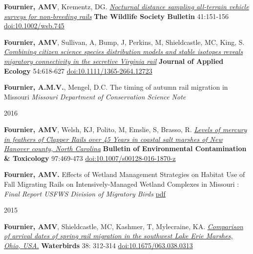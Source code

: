 \documentclass[]{article}
\begin{document}
\textbf{Fournier, AMV}, Krementz, DG.
\href{https://github.com/aurielfournier/aurielfournier.github.io/blob/master/_pdfs/Fournier_et_al-2017-Wildlife_Society_Bulletin.pdf}{\emph{Nocturnal
distance sampling all-terrain vehicle surveys for non-breeding rails}}
\textbf{The Wildlife Society Bulletin} 41:151-156
\url{doi:10.1002/wsb.745}

\textbf{Fournier, AMV}, Sullivan, A, Bump, J, Perkins, M, Shieldcastle,
MC, King, S.
\href{https://github.com/aurielfournier/aurielfournier.github.io/blob/master/_pdfs/Fournier\%20et\%20al.\%20-\%202016\%20-\%20Journal\%20of\%20Applied\%20Ecology.pdf}{\emph{Combining
citizen science species distribution models and stable isotopes reveals
migratory connectivity in the secretive Virginia rail}} \textbf{Journal
of Applied Ecology} 54:618-627 \url{doi:10.1111/1365-2664.12723}

\textbf{Fournier, A.M.V.}, Mengel, D.C. The timing of autumn rail
migration in Missouri \emph{Missouri Department of Conservation Science
Note}

2016

\textbf{Fournier, AMV}, Welsh, KJ, Polito, M, Emslie, S, Brasso, R.
\href{https://github.com/aurielfournier/aurielfournier.github.io/blob/master/_pdfs/Fournier\%20et\%20al.\%20-\%202016\%20-\%20Bulletin\%20of\%20Environmental\%20Contamination\%20and\%20Toxicology.pdf}{\emph{Levels
of mercury in feathers of Clapper Rails over 45 Years in coastal salt
marshes of New Hanover county, North Carolina}} \textbf{Bulletin of
Environmental Contamination \& Toxicology} 97:469-473
\url{doi:10.1007/s00128-016-1870-z}

\textbf{Fournier, AMV.} Effects of Wetland Management Strategies on
Habitat Use of Fall Migrating Rails on Intensively-Managed Wetland
Complexes in Missouri : \emph{Final Report USFWS Division of Migratory
Birds}
\href{https://www.fws.gov/migratorybirds/pdf/surveys-and-data/Webless\%20Migratory\%20Game\%20Birds/Marsh\%20Bird\%20pdf\%20files/EffectsofWetlandMgtStrategiesOnHabitatUseOfFallMigratingRails.pdf}{pdf}

2015

\textbf{Fournier, AMV}, Shieldcastle, MC, Kashmer, T, Mylecraine, KA.
\href{https://github.com/aurielfournier/aurielfournier.github.io/blob/master/_pdfs/Fournier\%20et\%20al.\%20-\%202015\%20-\%20Waterbirds.pdf}{\emph{Comparison
of arrival dates of spring rail migration in the southwest Lake Erie
Marshes, Ohio, USA.}} \textbf{Waterbirds} 38: 312-314
\url{doi:10.1675/063.038.0313}
\end{document}
